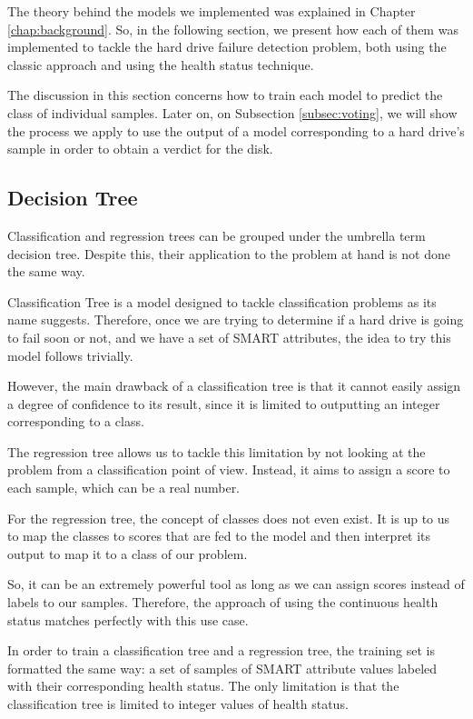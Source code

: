The theory behind the models we implemented was explained in Chapter \ref{chap:background}. 
So, in the following section, we present how each of them was implemented to tackle the hard drive failure detection problem, both using the classic approach and using the health status technique.

The discussion in this section concerns how to train each model to predict the class of individual samples.
Later on, on Subsection \ref{subsec:voting}, we will show the process we apply to use the output of a model corresponding to a hard drive's sample in order to obtain a verdict for the disk. 

\subsection{Decision Tree}\label{subsec:decision_tree}

Classification and regression trees can be grouped under the umbrella term decision tree.
Despite this, their application to the problem at hand is not done the same way.

Classification Tree is a model designed to tackle classification problems as its name suggests.
Therefore, once we are trying to determine if a hard drive is going to fail soon or not, and we have a set of SMART attributes, the idea to try this model follows trivially.

However, the main drawback of a classification tree is that it cannot easily assign a degree of confidence to its result, since it is limited to outputting an integer corresponding to a class.

The regression tree allows us to tackle this limitation by not looking at the problem from a classification point of view.
Instead, it aims to assign a score to each sample, which can be a real number.

For the regression tree, the concept of classes does not even exist.
It is up to us to map the classes to scores that are fed to the model and then interpret its output to map it to a class of our problem.

So, it can be an extremely powerful tool as long as we can assign scores instead of labels to our samples.
Therefore, the approach of using the continuous health status matches perfectly with this use case.

In order to train a classification tree and a regression tree, the training set is formatted the same way: a set of samples of SMART attribute values labeled with their corresponding health status.
The only limitation is that the classification tree is limited to integer values of health status.

